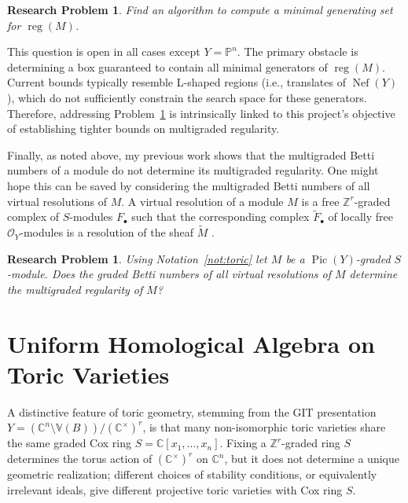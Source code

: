 \documentclass[11pt,reqno]{amsart}
\newtheorem{problem}[lemma]{Research Problem}
\theoremstyle{remark}
\newcommand{\reg}{\operatorname{reg}}
\newcommand{\Pic}{\operatorname{Pic}}
\newcommand{\Nef}{\operatorname{Nef}}
\newcommand{\CC}{\mathbb{C}}
\newcommand{\PP}{\mathbb{P}}
\newcommand{\VV}{\mathbb{V}}
\newcommand{\ZZ}{\mathbb{Z}}
\newcommand{\cO}{\mathcal{O}}
\begin{document}
\begin{problem}\label{prob:mg-reg-alg}
	Find an algorithm to compute a minimal generating set for $\reg(M)$. 
\end{problem}

This question is open in all cases except $Y=\PP^n$. The primary obstacle is determining a box guaranteed to contain all minimal generators of $\reg(M)$. Current bounds typically resemble L-shaped regions (i.e., translates of $\Nef(Y)$), which do not sufficiently constrain the search space for these generators. Therefore, addressing Problem~\ref{prob:mg-reg-alg} is intrinsically linked to this project's objective of establishing tighter bounds on multigraded regularity.


Finally, as noted above, my previous work shows that the multigraded Betti numbers of a module do not determine its multigraded regularity. One might hope this can be saved by considering the multigraded Betti numbers of all virtual resolutions of $M$. A virtual resolution of a module $M$ is a free $\ZZ^r$-graded complex of $S$-modules $F_{\bullet}$ such that the corresponding complex $\tilde{F}_{\bullet}$ of locally free $\cO_{Y}$-modules is a resolution of the sheaf $\tilde{M}$ \cite[Definition 1.1]{BES20}. 

\begin{problem}
	Using Notation~\ref{not:toric} let $M$ be a $\Pic(Y)$-graded $S$-module. Does the graded Betti numbers of all virtual resolutions of $M$ determine the multigraded regularity of $M$? 
\end{problem}


\section{Uniform Homological Algebra on Toric Varieties}\label{sec:uniform-homological-algebra-on-toric}

A distinctive feature of toric geometry, stemming from the GIT presentation $Y=(\CC^n\setminus \VV(B))/(\CC^{\times})^r$, is that many non-isomorphic toric varieties share the same graded Cox ring $S=\CC[x_1,\ldots,x_n]$.  Fixing a $\ZZ^r$-graded ring $S$ determines the torus action of $(\CC^{\times})^r$ on $\CC^{n}$, but it does not determine a unique geometric realization; different choices of stability conditions, or equivalently  irrelevant ideals,  give different projective toric varieties with Cox ring $S$. 
\end{document}

